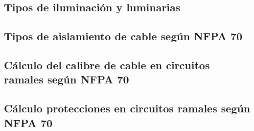 \subsection{Tipos de iluminación y luminarias}

\subsection{Tipos de aislamiento de cable según NFPA 70}

\subsection{Cálculo del calibre de cable en circuitos ramales según NFPA 70}

\subsection{Cálculo protecciones en circuitos ramales según NFPA 70}

















